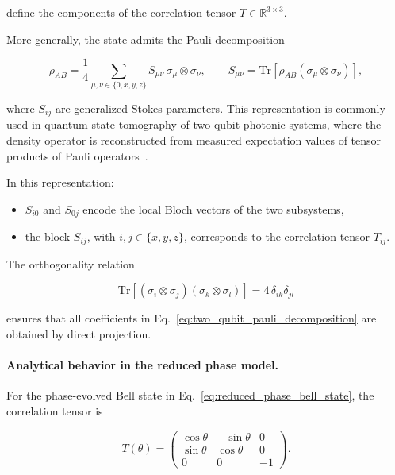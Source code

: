 define the components of the correlation tensor \( T \in \mathbb{R}^{3 \times 3} \).

\medskip

More generally, the state admits the Pauli decomposition

\begin{equation}
\rho_{AB}
=
\frac{1}{4}
\sum_{\mu,\nu \in \{0,x,y,z\}}
S_{\mu\nu}\,
\sigma_\mu \otimes \sigma_\nu,
\qquad
S_{\mu\nu}
=
\mathrm{Tr}
\left[
\rho_{AB}
\left(
\sigma_\mu \otimes \sigma_\nu
\right)
\right],
\label{eq:two_qubit_pauli_decomposition}
\end{equation}

where \( S_{ij} \) are generalized Stokes parameters. This representation is commonly used in quantum-state tomography of two-qubit photonic systems, where the density operator is reconstructed from measured expectation values of tensor products of Pauli operators~\cite{altepeter_james_kwiat_quantum_state_tomography}.

In this representation:
\begin{itemize}
    \item \( S_{i0} \) and \( S_{0j} \) encode the local Bloch vectors of the two subsystems,
    \item the block \( S_{ij} \), with \( i,j \in \{x,y,z\} \), corresponds to the correlation tensor \( T_{ij} \).
\end{itemize}

\medskip

The orthogonality relation

\begin{equation}
\mathrm{Tr}
\left[
(\sigma_i \otimes \sigma_j)
(\sigma_k \otimes \sigma_l)
\right]
=
4\,\delta_{ik}\delta_{jl}
\label{eq:pauli_tensor_orthogonality}
\end{equation}

ensures that all coefficients in Eq.~\eqref{eq:two_qubit_pauli_decomposition} are obtained by direct projection.

\medskip

\paragraph{Analytical behavior in the reduced phase model.}

For the phase-evolved Bell state in Eq.~\eqref{eq:reduced_phase_bell_state}, the correlation tensor is

\begin{equation}
T(\theta)
=
\begin{pmatrix}
\cos\theta & -\sin\theta & 0\\
\sin\theta & \cos\theta & 0\\
0 & 0 & -1
\end{pmatrix}.
\label{eq:correlation_tensor_phase_model}
\end{equation}

